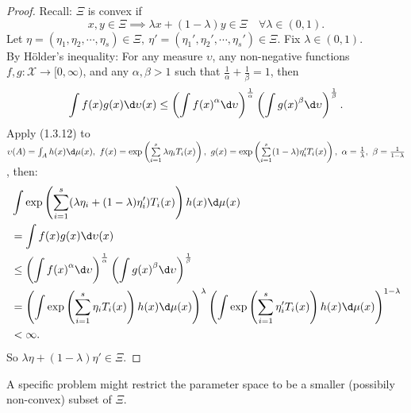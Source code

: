 \documentclass[a4paper]{article}
\begin{document}
\begin{proof}
	Recall: $\Xi$ is convex if
	\begin{equation*}
		x, y \in \Xi \implies \lambda x + (1-\lambda)y \in \Xi \quad \forall \lambda \in (0,1).
	\end{equation*}
	Let $\eta = (\eta_1,\eta_2,\cdots,\eta_s) \in \Xi, \ \eta' = (\eta_1',\eta_2',\cdots,\eta_s') \in \Xi$. Fix $\lambda \in (0,1)$. \\
	\newline
	By Hölder's inequality: For any measure $\upsilon$, any non-negative functions $f,g: \mathcal{X} \to [0,\infty)$, and any $\alpha,\beta > 1$ such that $\frac{1}{\alpha}+\frac{1}{\beta} = 1$, then
	\begin{equation}
		\int f(x)g(x) \d \upsilon (x) \leq \left(\int {f(x)}^{\alpha} \d \upsilon\right)^{\frac{1}{\alpha}}\left(\int {g(x)}^{\beta} \d \upsilon\right)^{\frac{1}{\beta}}.
	\end{equation}
	\noindent Apply (1.3.12) to $\upsilon(A) = \int_A h(x) \d \mu (x), \ f(x) = \exp\left(\sum\limits_{i = 1}^s \lambda \eta_i T_i(x)\right), \ g(x) = \exp\left(\sum\limits_{i = 1}^s (1 - \lambda)\eta_i' T_i (x)\right), \ \alpha = \frac{1}{\lambda}, \ \beta = \frac{1}{1-\lambda}$, then:
	\begin{equation}
		\begin{aligned}
			&\int \exp \left(\sum\limits_{i = 1}^s(\lambda \eta_i + (1-\lambda) \eta_i')T_i (x)\right)h(x) \d \mu (x) \\
			&= \int f(x)g(x) \d \upsilon (x) \\
			& \leq \left(\int {f(x)}^{\alpha} \d \upsilon\right)^{\frac{1}{\alpha}}\left(\int {g(x)}^{\beta} \d \upsilon\right)^{\frac{1}{\beta}} \\
			&= \left(\int \exp\left(\sum\limits_{i = 1}^s \eta_i T_i(x)\right) h(x) \d \mu (x)\right)^{\lambda} \left(\int \exp\left(\sum\limits_{i = 1}^s \eta_i' T_i (x)\right) h(x) \d \mu (x)\right)^{1 - \lambda} \\
			&< \infty.
		\end{aligned}
	\end{equation}
	So $\lambda \eta + (1-\lambda)\eta' \in \Xi$.
\end{proof}

\begin{remark}
	A specific problem might restrict the parameter space to be a smaller (possibily non-convex) subset of $\Xi$.
\end{remark}
\end{document}
